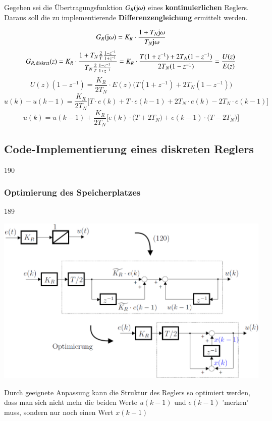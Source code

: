 
Gegeben sei die Übertragungsfunktion $G_R(\mathrm{j} \omega)$ eines \textbf{kontinuierlichen} Reglers.
Daraus soll die zu implementierende \textbf{Differenzengleichung} ermittelt werden.

$$ G_R(\mathrm{j} \omega) = K_R \cdot \frac{1 + T_N \mathrm{j} \omega}{T_N \mathrm{j} \omega} $$
$$ G_{R, \, \rm diskret}(z) = K_R \cdot \frac{1 + T_N \frac{2}{T} \frac{1- z^{-1}}{1 + z^{-1}}}{T_N \frac{2}{T} \frac{1- z^{-1}}{1 + z^{-1}}} 
    = K_R \cdot \frac{T (1 + z^{-1}) + 2 T_N (1 - z^{-1})}{2 T_N (1- z^{-1})} = \frac{U(z)}{E(z)} $$
$$ U(z) (1 - z^{-1}) = \frac{K_R}{2 T_N} \cdot E(z) \Big( T (1 + z^{-1}) + 2 T_N (1 - z^{-1}) \Big) $$
$$ u(k) - u(k-1) = \frac{K_R}{2 T_N} \Big[ T \cdot e(k) + T \cdot e(k-1) + 2 T_N \cdot e(k) - 2 T_N \cdot e(k-1) \Big] $$
$$ u(k) = u(k-1) + \frac{K_R}{2 T_N} \Big[ e(k) \cdot \big( T + 2 T_N  \big) +  e(k-1) \cdot \big( T - 2 T_N  \big)  \Big]  $$


\subsection{Code-Implementierung eines diskreten Reglers}{190}




\subsubsection{Optimierung des Speicherplatzes}{189}

\begin{minipage}[c]{0.6\columnwidth}
     \includegraphics[width=\columnwidth]{images/optimierung_speicherplatz.png}
\end{minipage}
\hfill
\begin{minipage}[c]{0.39\columnwidth}
    Durch geeignete Anpassung kann die Struktur des Reglers so optimiert werden, dass man sich nicht mehr die beiden Werte $u(k-1)$ und $e(k-1)$
    'merken' muss, sondern nur noch einen Wert $x(k-1)$
\end{minipage}

